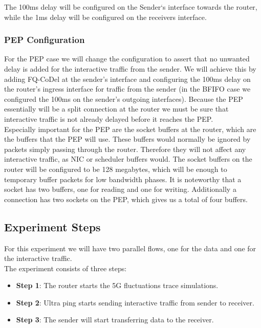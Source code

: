 \documentclass[a4paper,english, 11pt]{report}
\begin{document}
The 100ms delay will be configured on the Sender`s interface towards the router, while the 1ms delay will be configured on the receivers interface.

\subsubsection{PEP Configuration}
For the PEP case we will change the configuration to assert that no unwanted delay is added for the interactive traffic from the sender. We will achieve this by adding FQ-CoDel at the sender's interface and configuring the 100ms delay on the router's ingress interface for traffic from the sender (in the BFIFO case we configured the 100ms on the sender's outgoing interfaces). Because the PEP essentially will be a split connection at the router we must be sure that interactive traffic is not already delayed before it reaches the PEP.\\

Especially important for the PEP are the socket buffers at the router, which are the buffers that the PEP will use. These buffers would normally be ignored by packets simply passing through the router. Therefore they will not affect any interactive traffic, as NIC or scheduler buffers would. The socket buffers on the router will be configured to be 128 megabytes, which will be enough to temporary buffer packets for low bandwidth phases. It is noteworthy that a socket has two buffers, one for reading and one for writing. Additionally a connection has two sockets on the PEP, which gives us a total of four buffers.\\

\subsection{Experiment Steps}
For this experiment we will have two parallel flows, one for the data and one for the interactive traffic.\\

The experiment consists of three steps:
\begin{itemize}
  \item \textbf{Step 1}: The router starts the 5G fluctuations trace simulations.
  \item \textbf{Step 2}: Ultra ping starts sending interactive traffic from sender to receiver.
  \item \textbf{Step 3}: The sender will start transferring data to the receiver.
\end{itemize}
\end{document}
